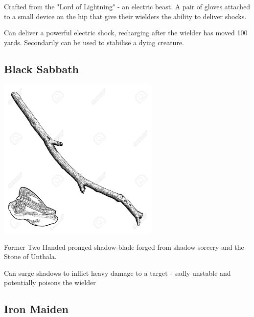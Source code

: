 \noindent 

Crafted from the "Lord of Lightning" - an electric beast. A pair of gloves attached to a small device on the hip that give their wielders the ability to deliver shocks.

Can deliver a powerful electric shock, recharging after the wielder has moved 100 yards. Secondarily can be used to stabilise a dying creature.

\smallskip

\subsection*{Black Sabbath} 

\begin{center}
\includegraphics[width=80mm]{./content/img/xxx.png}
\begin{figure}[h]
\end{figure}
\end{center}

\noindent 

Former Two Handed pronged shadow-blade forged from shadow sorcery and the Stone of Unthala.

Can surge shadows to inflict heavy damage to a target - sadly unstable and potentially poisons the wielder

\smallskip

\subsection*{Iron Maiden} 

